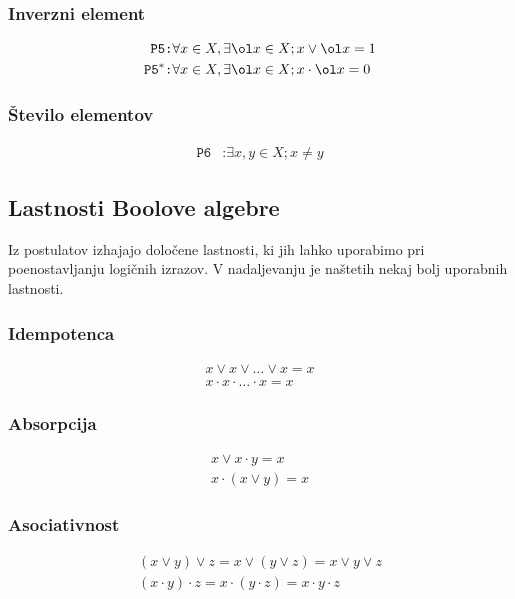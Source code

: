\subsubsection*{Inverzni element}
\begin{align*}
\texttt{P5}&\texttt{:}\forall x \in X, \exists \ol x \in X; x \vee \ol x = 1\\
\texttt{P5}^*&\texttt{:}\forall x \in X, \exists \ol x \in X; x \cdot \ol x = 0
\end{align*}

\subsubsection*{Število elementov}
\begin{align*}
\texttt{P6}&\texttt{:}\exists x,y \in X; x \neq y
\end{align*}

\subsection{Lastnosti Boolove algebre}
Iz postulatov izhajajo določene lastnosti, ki jih lahko uporabimo pri poenostavljanju logičnih izrazov. V nadaljevanju je naštetih nekaj bolj uporabnih lastnosti.
\subsubsection*{Idempotenca}
\begin{align*}
x \vee x \vee \dots \vee x = x\\
x \cdot x \cdot \dots \cdot x = x
\end{align*}

\subsubsection*{Absorpcija}
\begin{align*}
x \vee x \cdot y = x\\
x \cdot \left( x \vee y\right) = x
\end{align*}

\subsubsection*{Asociativnost}
\begin{align*}
\left(x \vee y \right)\vee z = x \vee \left(y \vee z \right)= x \vee y \vee z\\
\left(x \cdot y \right)\cdot z = x \cdot \left(y \cdot z \right)= x \cdot y \cdot z
\end{align*}


